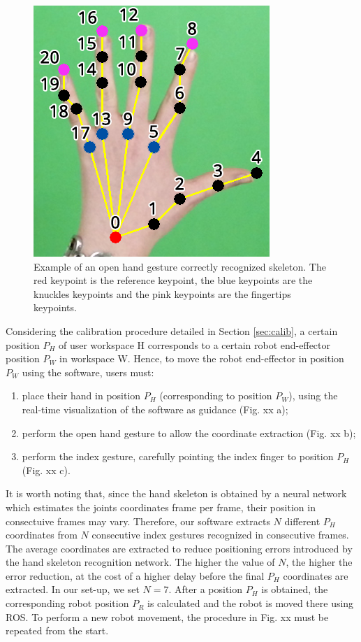 \documentclass[letterpaper, 10 pt, conference]{ieeeconf}  %
\begin{document}
\begin{figure} [h!]
  \centering
  \includegraphics[width=0.7\columnwidth]{figures/hand.png}
  \caption{Example of an open hand gesture correctly recognized skeleton. The red keypoint is the reference keypoint, the blue keypoints are the knuckles keypoints and the pink keypoints are the fingertips keypoints.}
  \label{fig:keypoints}
\end{figure}

Considering the calibration procedure detailed in Section \ref{sec:calib}, a certain position $P_H$ of user workspace H corresponds to a certain robot end-effector position $P_W$ in workspace W. Hence, to move the robot end-effector in position $P_W$  using the software, users must: %
\begin{enumerate}
\item place their hand in position $P_H$ (corresponding to position $P_W$), using the real-time visualization of the software as guidance (Fig. xx a);
\item perform the open hand gesture to allow the coordinate extraction (Fig. xx b);
\item perform the index gesture, carefully pointing the index finger to position $P_H$ (Fig. xx c).
\end{enumerate}

It is worth noting that, since the hand skeleton is obtained by a neural network which estimates the joints coordinates frame per frame, their position in consectuive frames may vary. Therefore, our software extracts $N$ different $P_H$ coordinates from $N$ consecutive index gestures recognized in consecutive frames. The average coordinates are extracted to reduce positioning errors introduced by the hand skeleton recognition network. The higher the value of $N$, the higher the error reduction, at the cost of a higher delay before the final $P_H$ coordinates are extracted. In our set-up, we set $N = 7$.
After a position $P_H$ is obtained, the corresponding robot position $P_R$ is calculated and the robot is moved there using ROS.
To perform a new robot movement, the procedure in Fig. xx must be repeated from the start.
\end{document}
